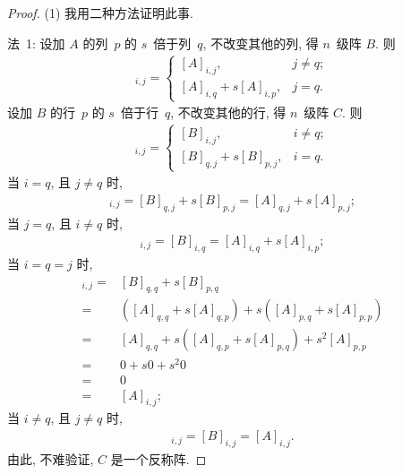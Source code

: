 \begin{proof}
    (1)
    我用二种方法证明此事.

    法~1:
    设加 \(A\) 的列~\(p\) 的 \(s\)~倍于列~\(q\),
    不改变其他的列, 得 \(n\)~级阵 \(B\).
    则
    \begin{align*}
        [B]_{i,j}
        = \begin{cases}
              [A]_{i,j},              & j \neq q; \\
              [A]_{i,q} + s[A]_{i,p}, & j = q.
          \end{cases}
    \end{align*}
    设加 \(B\) 的行~\(p\) 的 \(s\)~倍于行~\(q\),
    不改变其他的行, 得 \(n\)~级阵 \(C\).
    则
    \begin{align*}
        [C]_{i,j}
        = \begin{cases}
              [B]_{i,j},              & i \neq q; \\
              [B]_{q,j} + s[B]_{p,j}, & i = q.
          \end{cases}
    \end{align*}
    当 \(i = q\), 且 \(j \neq q\) 时,
    \begin{align*}
        [C]_{i,j}
            = [B]_{q,j} + s[B]_{p,j}
            = [A]_{q,j} + s[A]_{p,j};
    \end{align*}
    当 \(j = q\), 且 \(i \neq q\) 时,
    \begin{align*}
        [C]_{i,j}
            = [B]_{i,q}
            = [A]_{i,q} + s[A]_{i,p};
    \end{align*}
    当 \(i = q = j\) 时,
    \begin{align*}
        [C]_{i,j}
        = {} &
        [B]_{q,q} + s[B]_{p,q}
        \\
        = {} &
        ([A]_{q,q} + s[A]_{q,p}) + s([A]_{p,q} + s[A]_{p,p})
        \\
        = {} &
        [A]_{q,q} + s([A]_{q,p} + s[A]_{p,q}) + s^2 [A]_{p,p}
        \\
        = {} &
        0 + s 0 + s^2 0
        \\
        = {} &
        0
        \\
        = {} &
        [A]_{i,j};
    \end{align*}
    当 \(i \neq q\), 且 \(j \neq q\) 时,
    \begin{align*}
        [C]_{i,j} = [B]_{i,j} = [A]_{i,j}.
    \end{align*}
    由此, 不难验证, \(C\) 是一个反称阵.


\end{proof}
